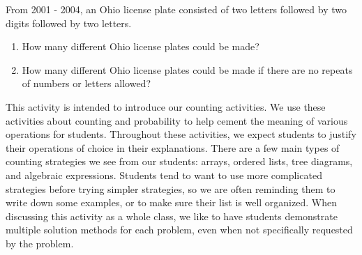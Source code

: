 \documentclass{ximera}
\begin{document}
\begin{problem}
From 2001 - 2004, an Ohio license plate consisted of two letters followed by two digits followed by two letters.
\begin{enumerate}
\item How many different Ohio license plates could be made?
\item How many different Ohio license plates could be made if there are no repeats of numbers or letters allowed?
\end{enumerate}
\end{problem}


\newpage
\begin{instructorNotes}
This activity is intended to introduce our counting activities.  We use these activities about counting and probability to help cement the meaning of various operations for students.  Throughout these activities, we expect students to justify their operations of choice in their explanations.  There are a few main types of counting strategies we see from our students: arrays, ordered lists, tree diagrams, and algebraic expressions.  Students tend to want to use more complicated strategies before trying simpler strategies, so we are often reminding them to write down some examples, or to make sure their list is well organized. When discussing this activity as a whole class, we like to have students demonstrate multiple solution methods for each problem, even when not specifically requested by the problem.  

\end{instructorNotes}
\end{document}
